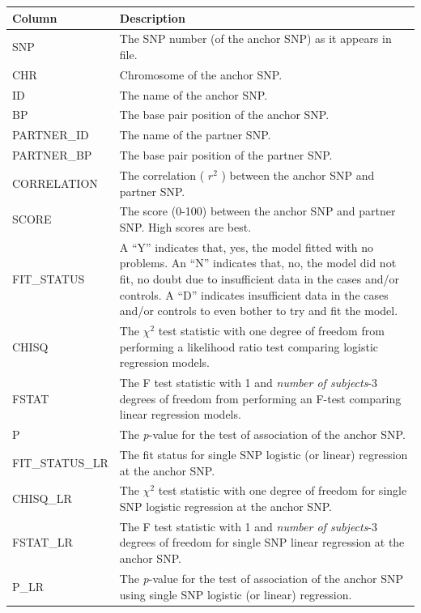 \documentclass[a4paper,12pt]{article}
\begin{document}
{\begin{center}\begin{tabular}{ll}
Column  & Description\\
\hline
SNP  & The SNP number (of the anchor SNP) as it appears in file.\\
CHR  & Chromosome of the anchor SNP.\\
ID  & The name of the anchor SNP.\\
BP  & The base pair position of the anchor SNP.\\
PARTNER\_ID & The name of the partner SNP.\\
PARTNER\_BP & The base pair position of the partner SNP.\\
CORRELATION  & The correlation ( $r^2$ ) between the anchor SNP and partner SNP.\\
SCORE  & The score (0-100) between the anchor SNP and partner SNP. High scores are best.\\
FIT\_STATUS & A ``Y'' indicates that, yes, the model fitted with no problems. An ``N'' indicates that, no, the model did not fit, no doubt due to insufficient data in the cases and/or controls. A ``D'' indicates insufficient data in the cases and/or controls to even bother to try and fit the model.\\
CHISQ  & The $\chi^2$ test statistic with one degree of freedom from performing a likelihood ratio test comparing logistic regression models.\\
FSTAT  & The F test statistic with 1 and {\it number of subjects}-3 degrees of freedom from performing an F-test comparing linear regression models.\\
P  & The {\it p}-value for the test of association of the anchor SNP.\\
FIT\_STATUS\_LR & The fit status for single SNP logistic (or linear) regression at the anchor SNP.\\
CHISQ\_LR & The $\chi^2$ test statistic with one degree of freedom for single SNP logistic regression at the anchor SNP.\\
FSTAT\_LR & The F test statistic with 1 and {\it number of subjects}-3 degrees of freedom for single SNP linear regression at the anchor SNP.\\
P\_LR & The {\it p}-value for the test of association of the anchor SNP using single SNP logistic (or linear) regression.\\
\end{tabular}\end{center}}
\end{document}
